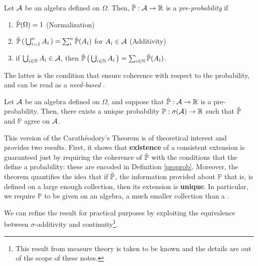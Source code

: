 \goodbreak\begin{my_definition}
	\label{proprob}
	Let $\mathcal{A}$ be an algebra defined on $\Omega$. Then, $\tilde{\mathbb{P}}:\mathcal{A}\to\mathbb{R}$ is a \textit{pre-probability} if
	\begin{enumerate}
		\item $\tilde{\mathbb{P}}( \Omega ) = 1$ \hfill (Normalization)
		\item $\tilde{\mathbb{P}} \left( \, \bigcup^n_{i=1} A_i \, \right) = \sum^n_i \tilde{\mathbb{P}}(A_i)$ for $A_i\in\mathcal{A}$ \hfill (Additivity)
		\item if $\bigcup_{ i \in \mathbb{N} } A_i \in \mathcal{A}$, then $\tilde{\mathbb{P}} \left( \,\bigcup_{ i \in \mathbb{N} } A_i \,\right) = \sum_{ i \in \mathbb{N}} \tilde{\mathbb{P}}(A_i)$.
	\end{enumerate}
\end{my_definition}
\begin{my_remark}
	The latter is the condition that ensure coherence with respect to the probability, and can be read as a \textit{need-based \sigmaadd}.
\end{my_remark}

\goodbreak\begin{my_theorem}
	\label{carathéorodory}
	Let $\mathcal{A}$ be an algebra defined on $\Omega$, and suppose that $\tilde{\mathbb{P}} : \mathcal{A} \to \mathbb{R}$ is a pre-probability.	Then, there exists a unique probability $\mathbb{P}: \sigma ( \mathcal{A} ) \to \mathbb{R}$ such that $\tilde{\mathbb{P}}$ and $\mathbb{P}$ agree on $\mathcal{A}$.
\end{my_theorem}
\begin{my_remark}
	This version of the Carathéodory's Theorem is of theoretical interest and provides two results.
	First, it shows that \textbf{existence} of a consistent extension is guaranteed just by requiring the coherence of $\tilde{\mathbb{P}}$ with the conditions that the define a probability: these are encoded in Definition \ref{proprob}.
	Moreover, the theorem quantifies the idea that if $\tilde{\mathbb{P}}$, the information provided about $\mathbb{P}$ that is, is defined on a large enough collection, then its extension is \textbf{unique}. 
	In particular, we require $\mathbb{P}$ to be given on an algebra, a much smaller collection than a \sigmaalg.
\end{my_remark}

We can refine the result for practical purposes by exploiting the equivalence between $\sigma$-additivity and continuity\footnote{This result from measure theory is taken to be known and the details are out of the scope of these notes.}.

